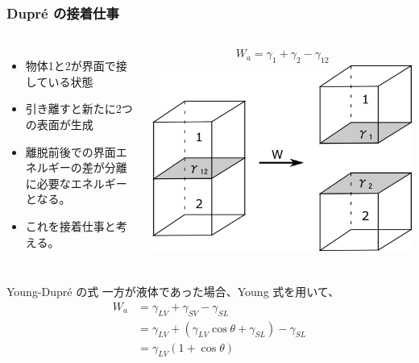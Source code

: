 \documentclass[unicode,12pt]{beamer}%
\begin{document}
\begin{frame}
	\frametitle{Dupr\'{e} の接着仕事}
		\begin{columns}[c, onlytextwidth]
				\begin{itemize}
					\item 物体1と2が界面で接している状態
					\item 引き離すと新たに2つの表面が生成
					\item 離脱前後での界面エネルギーの差が\alert{分離に必要なエネルギー}となる。
					\item これを\alert{接着仕事}と考える。
				\end{itemize}

				\vspace{-10mm}
				\begin{align*}
					W_{a} = \gamma_1 + \gamma_2 - \gamma_{12}
				\end{align*}
			\centering
			\includegraphics[width=\textwidth]{settyaku_shigoto.png}
		\end{columns}

		\pause
		\begin{alertblock}{Young-Dupr\'{e} の式}
			一方が液体であった場合、Young 式を用いて、
			\vspace{-5mm}
			\begin{align*}
				W_{a} &= \gamma_{LV} + \gamma_{SV} - \gamma_{SL} \\
				&= \gamma_{LV} + (\gamma_{LV} \cos \theta + \gamma_{SL}) - \gamma_{SL} \\
				&= \gamma_{LV}(1 + \cos \theta)
			\end{align*}
		\end{alertblock}
\end{frame}
\end{document}
